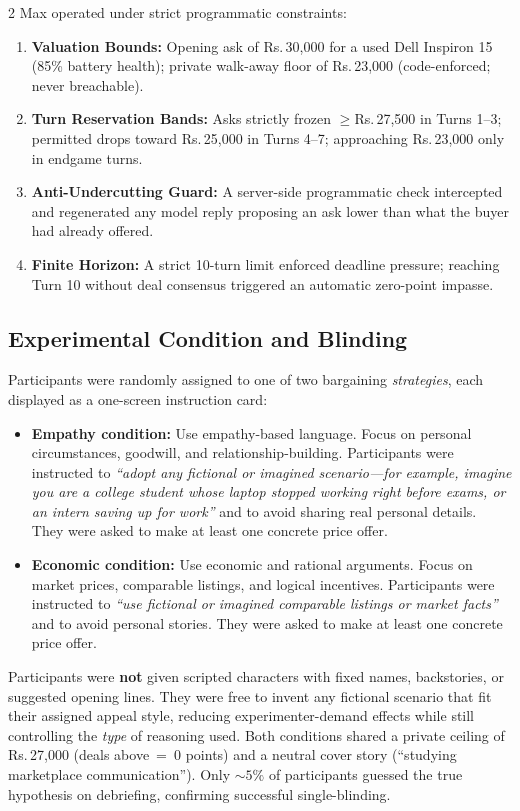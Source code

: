 \documentclass[10pt,a4paper]{article}
\newcommand{\rs}{\textsf{Rs.\,}}
\begin{document}
\begin{multicols}{2}
Max operated under strict programmatic constraints:
\begin{enumerate}
  \item \textbf{Valuation Bounds:} Opening ask of \rs30,000 for a used Dell Inspiron 15 (85\% battery health); private walk-away floor of \rs23,000 (code-enforced; never breachable).
  \item \textbf{Turn Reservation Bands:} Asks strictly frozen $\geq$\rs27,500 in Turns 1--3; permitted drops toward \rs25,000 in Turns 4--7; approaching \rs23,000 only in endgame turns.
  \item \textbf{Anti-Undercutting Guard:} A server-side programmatic check intercepted and regenerated any model reply proposing an ask lower than what the buyer had already offered.
  \item \textbf{Finite Horizon:} A strict 10-turn limit enforced deadline pressure; reaching Turn 10 without deal consensus triggered an automatic zero-point impasse.
\end{enumerate}

\subsection{Experimental Condition and Blinding}

Participants were randomly assigned to one of two bargaining \emph{strategies}, each displayed as a one-screen instruction card:

\begin{itemize}
  \item \textbf{Empathy condition:} Use empathy-based language. Focus on personal circumstances, goodwill, and relationship-building. Participants were instructed to \emph{``adopt any fictional or imagined scenario---for example, imagine you are a college student whose laptop stopped working right before exams, or an intern saving up for work''} and to avoid sharing real personal details. They were asked to make at least one concrete price offer.
  \item \textbf{Economic condition:} Use economic and rational arguments. Focus on market prices, comparable listings, and logical incentives. Participants were instructed to \emph{``use fictional or imagined comparable listings or market facts''} and to avoid personal stories. They were asked to make at least one concrete price offer.
\end{itemize}

Participants were \textbf{not} given scripted characters with fixed names, backstories, or suggested opening lines. They were free to invent any fictional scenario that fit their assigned appeal style, reducing experimenter-demand effects while still controlling the \emph{type} of reasoning used. Both conditions shared a private ceiling of \rs27,000 (deals above~=~0 points) and a neutral cover story (``studying marketplace communication''). Only ${\sim}5\%$ of participants guessed the true hypothesis on debriefing, confirming successful single-blinding.


\end{multicols}
\end{document}
